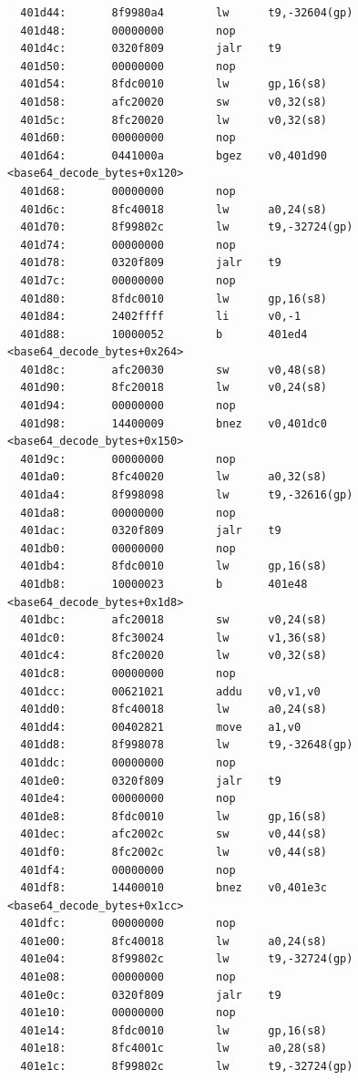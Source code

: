 \documentclass[11pt]{article}
\begin{document}
\begin{verbatim}
  401d44:       8f9980a4        lw      t9,-32604(gp)
  401d48:       00000000        nop
  401d4c:       0320f809        jalr    t9
  401d50:       00000000        nop
  401d54:       8fdc0010        lw      gp,16(s8)
  401d58:       afc20020        sw      v0,32(s8)
  401d5c:       8fc20020        lw      v0,32(s8)
  401d60:       00000000        nop
  401d64:       0441000a        bgez    v0,401d90 <base64_decode_bytes+0x120>
  401d68:       00000000        nop
  401d6c:       8fc40018        lw      a0,24(s8)
  401d70:       8f99802c        lw      t9,-32724(gp)
  401d74:       00000000        nop
  401d78:       0320f809        jalr    t9
  401d7c:       00000000        nop
  401d80:       8fdc0010        lw      gp,16(s8)
  401d84:       2402ffff        li      v0,-1
  401d88:       10000052        b       401ed4 <base64_decode_bytes+0x264>
  401d8c:       afc20030        sw      v0,48(s8)
  401d90:       8fc20018        lw      v0,24(s8)
  401d94:       00000000        nop
  401d98:       14400009        bnez    v0,401dc0 <base64_decode_bytes+0x150>
  401d9c:       00000000        nop
  401da0:       8fc40020        lw      a0,32(s8)
  401da4:       8f998098        lw      t9,-32616(gp)
  401da8:       00000000        nop
  401dac:       0320f809        jalr    t9
  401db0:       00000000        nop
  401db4:       8fdc0010        lw      gp,16(s8)
  401db8:       10000023        b       401e48 <base64_decode_bytes+0x1d8>
  401dbc:       afc20018        sw      v0,24(s8)
  401dc0:       8fc30024        lw      v1,36(s8)
  401dc4:       8fc20020        lw      v0,32(s8)
  401dc8:       00000000        nop
  401dcc:       00621021        addu    v0,v1,v0
  401dd0:       8fc40018        lw      a0,24(s8)
  401dd4:       00402821        move    a1,v0
  401dd8:       8f998078        lw      t9,-32648(gp)
  401ddc:       00000000        nop
  401de0:       0320f809        jalr    t9
  401de4:       00000000        nop
  401de8:       8fdc0010        lw      gp,16(s8)
  401dec:       afc2002c        sw      v0,44(s8)
  401df0:       8fc2002c        lw      v0,44(s8)
  401df4:       00000000        nop
  401df8:       14400010        bnez    v0,401e3c <base64_decode_bytes+0x1cc>
  401dfc:       00000000        nop
  401e00:       8fc40018        lw      a0,24(s8)
  401e04:       8f99802c        lw      t9,-32724(gp)
  401e08:       00000000        nop
  401e0c:       0320f809        jalr    t9
  401e10:       00000000        nop
  401e14:       8fdc0010        lw      gp,16(s8)
  401e18:       8fc4001c        lw      a0,28(s8)
  401e1c:       8f99802c        lw      t9,-32724(gp)

\end{verbatim}
\end{document}
